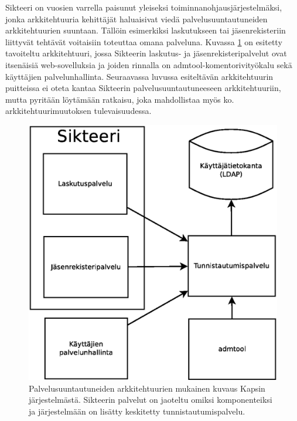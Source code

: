 Sikteeri on vuosien varrella paisunut yleiseksi toiminnanohjausjärjestelmäksi, jonka arkkitehtuuria kehittäjät haluaisivat viedä palvelusuuntautuneiden arkkitehtuurien suuntaan. Tällöin esimerkiksi laskutukseen tai jäsenrekisteriin liittyvät tehtävät voitaisiin toteuttaa omana palveluna. Kuvassa \ref{kapsi_uusi} on esitetty tavoiteltu arkkitehtuuri, jossa Sikteerin laskutus- ja jäsenrekisteripalvelut ovat itsenäisiä web-sovelluksia ja joiden rinnalla on admtool-komentorivityökalu sekä käyttäjien palvelunhallinta. Seuraavassa luvussa esiteltävän arkkitehtuurin puitteissa ei oteta kantaa Sikteerin palvelusuuntautuneeseen arkkitehtuuriin, mutta pyritään löytämään ratkaisu, joka mahdollistaa myös ko. arkkitehtuurimuutoksen tulevaisuudessa.

\begin{figure}[ht]
\centering
\includegraphics[width=.6\textwidth]{toteutus/muutostarve/kapsi_uusi_soa.eps}
\caption{Palvelusuuntautuneiden arkkitehtuurien mukainen kuvaus Kapsin järjestelmästä. Sikteerin palvelut on jaoteltu omiksi komponenteiksi ja järjestelmään on lisätty keskitetty tunnistautumispalvelu.}%
\label{kapsi_uusi}
\end{figure}